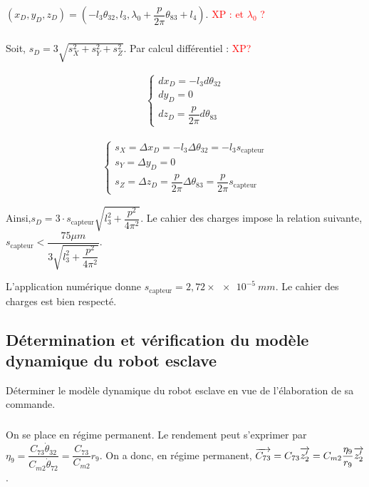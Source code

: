 \documentclass[10pt,fleqn]{article} %
\begin{document}
  $\left(x_D,y_D,z_D\right)=
\left(-l_3 \theta_{32},l_3, \lambda_0 + \dfrac{p}{2\pi} \theta_{83} +l_4\right)$. \textcolor{red}{XP : et $\lambda_0$ ?}

\subparagraph{}%

Soit, $s_D=3\sqrt{s_X^2+s_Y^2+s_Z^2}$. Par calcul différentiel :  \textcolor{red}{XP?}

\begin{minipage}{0.5\textwidth}
\begin{align*}
\left\{
\begin{array}{c}
dx_D=-l_3d\theta_{32}\\
dy_D=0\\
dz_D=\dfrac{p}{2\pi}d\theta_{83}
\end{array}
\right.
\end{align*}
\end{minipage}
\begin{minipage}{0.5\textwidth}

\begin{align*}
\left\{
\begin{array}{c}
s_X=\Delta x_D=-l_3\Delta \theta_{32}=-l_3 s_{\text{capteur}}\\
s_Y=\Delta y_D=0\\
s_Z=\Delta z_D=\dfrac{p}{2\pi}\Delta \theta_{83}=\dfrac{p}{2\pi}s_{\text{capteur}}
\end{array}
\right.
\end{align*}
\end{minipage}

Ainsi,$
s_D=3\cdot s_{\text{capteur}}\sqrt{l_3^2+\dfrac{p^2}{4\pi^2}}
$.
Le cahier des charges impose la relation suivante,$
s_{\text{capteur}}<\dfrac{75\mu m}{3\sqrt{l_3^2+\dfrac{p^2}{4\pi^2}}}
$.

L'application numérique donne $s_{\text{capteur}}=2,72\times \SI{e-5}{mm}$. Le cahier des charges est bien respecté.


\subsection{Détermination et vérification du modèle dynamique du robot esclave}
\begin{obj}
Déterminer le modèle dynamique du robot esclave en vue de l’élaboration de sa commande.
\end{obj}

\subparagraph{}%
On se place en régime permanent. Le rendement peut s'exprimer par 
$\eta_9 =\dfrac{C_{73}\dot{\theta}_{32}}{C_{m2}\dot{\theta}_{72}}=\dfrac{C_{73}}{C_{m2}}r_9$. 
On a donc, en régime permanent, $\overrightarrow{C_{73}}=C_{73}\overrightarrow{z'_2}=C_{m2}\dfrac{\eta_9}{r_9}\overrightarrow{z'_2}$.
\end{document}
